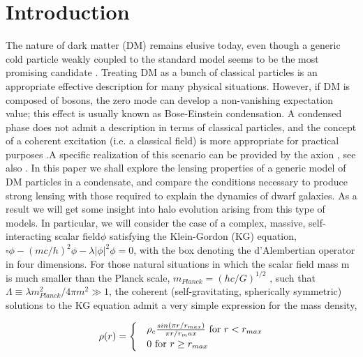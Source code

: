 \documentclass[%
 twocolumn,
 amsmath,amssymb,
 aps,
]{revtex4-2}
\begin{document}
\section{Introduction }
The nature of dark matter (DM) remains elusive today,
even though a generic cold particle weakly coupled to the
standard model seems to be the most promising candidate . Treating DM as a bunch of classical particles is an appropriate effective description for many physical situations. However, if DM is composed of bosons, the zero mode can develop a non-vanishing expectation value; this effect is usually known as Bose-Einstein condensation. A condensed phase does not admit a description in terms of classical particles, and the concept of a coherent excitation (i.e. a classical field) is more appropriate for practical purposes .A specific realization of this scenario can be provided by the axion \cite{Peccei}, see also .
In this paper we shall explore the lensing properties of a generic model of DM particles in a condensate, and compare the conditions necessary to produce strong lensing with those required to explain the dynamics of dwarf galaxies. As a result we will get some insight into halo evolution arising from this type of models.
In particular, we will consider the case of a complex, massive, self-interacting scalar field$ \phi$ satisfying
the Klein-Gordon (KG) equation,$ \square \phi -(mc/h)^{2}\phi-\lambda \left |\phi   \right |^{2}\phi =0$, with the box denoting the d’Alembertian operator in four dimensions. For those natural situations in which the scalar field mass m is much smaller than the Planck scale, $m_{Planck} = (hc/G)^ {1/2}$ , such that $\Lambda \equiv \lambda m_{Planck}^{2}/4\pi m^{2}\gg 1$, the coherent (self-gravitating, spherically symmetric) solutions to the KG equation admit a very simple expression for the mass density\cite{Colpi},

\begin{equation}
   \rho(r)=
\begin{cases}
 & \rho_{c}\frac{sin(\pi r/r_{max})}{\pi r/r_max}  \textup{  for  } r< r_{max} \\ 
 &      0    \textup{ for } r\geq r_{max} 
\end{cases}
    \label{equation 1}
\end{equation}  
\end{document}
